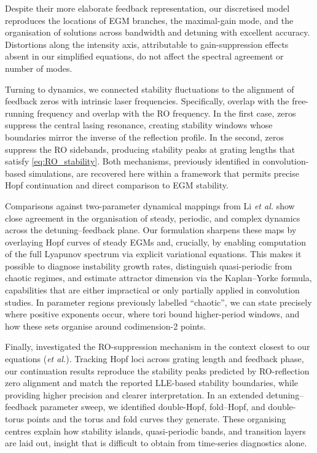 Despite their more elaborate feedback representation, our discretised model reproduces the locations of EGM branches, the maximal-gain mode, and the organisation of solutions across bandwidth and detuning with excellent accuracy.
Distortions along the intensity axis, attributable to gain-suppression effects absent in our simplified equations, do not affect the spectral agreement or number of modes.
%
\par
%
Turning to dynamics, we connected stability fluctuations to the alignment of feedback zeros with intrinsic laser frequencies.
Specifically, overlap with the free-running frequency and overlap with the RO frequency. 
In the first case, zeros suppress the central lasing resonance, creating stability windows whose boundaries mirror the inverse of the reflection profile.
In the second, zeros suppress the RO sidebands, producing stability peaks at grating lengths that satisfy \eqref{eq:RO_stability}.
Both mechanisms, previously identified in convolution-based simulations, are recovered here within a framework that permits precise Hopf continuation and direct comparison to EGM stability.
%
\par
%
Comparisons against two-parameter dynamical mappings from Li \textit{et al.} show close agreement in the organisation of steady, periodic, and complex dynamics across the detuning–feedback plane.
Our formulation sharpens these maps by overlaying Hopf curves of steady EGMs and, crucially, by enabling computation of the full Lyapunov spectrum via explicit variational equations.
This makes it possible to diagnose instability growth rates, distinguish quasi-periodic from chaotic regimes, and estimate attractor dimension via the Kaplan–Yorke formula, capabilities that are either impractical or only partially applied in convolution studies.
In parameter regions previously labelled “chaotic”, we can state precisely where positive exponents occur, where tori bound higher-period windows, and how these sets organise around codimension-2 points.
%
\par
%
Finally, investigated the RO-suppression mechanism in the context closest to our equations (\Skenderas \textit{et al.}).
Tracking Hopf loci across grating length and feedback phase, our continuation results reproduce the stability peaks predicted by RO-reflection zero alignment and match the reported LLE-based stability boundaries, while providing higher precision and clearer interpretation.
In an extended detuning–feedback parameter sweep, we identified double-Hopf, fold–Hopf, and double-torus points and the torus and fold curves they generate.
These organising centres explain how stability islands, quasi-periodic bands, and transition layers are laid out, insight that is difficult to obtain from time-series diagnostics alone.
%
%
